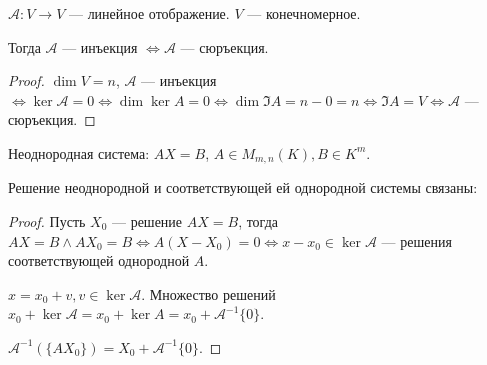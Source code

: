 \begin{theorem}
    $\mathcal{A}\!: V \to V$ --- линейное отображение.  $V$ --- конечномерное.

    Тогда  $\mathcal{A}$ --- инъекция  $\iff \mathcal{A}$ --- сюръекция.
\end{theorem}
\begin{proof}
    $\dim V = n$,  $\mathcal{A}$ --- инъекция  $\iff \ker \mathcal{A} = 0 \iff \dim \ker A = 0 \iff \dim \Im A = n - 0 = n \iff \Im A = V \iff \mathcal{A}$ --- сюръекция.
\end{proof}

\begin{definition}
    Неоднородная система: $AX=B$,  $A \in M_{m, n}(K), B \in K^m$.
\end{definition}
\begin{theorem}
    Решение неоднородной и соответствующей ей однородной системы связаны:

\end{theorem}
\begin{proof}
    Пусть $X_0$ --- решение $AX=B$, тогда  $AX=B \land AX_0=B \iff A(X-X_0) = 0 \iff x - x_0 \in \ker \mathcal{A}$ --- решения соответствующей однородной $A$.
    
    $x = x_0 + v, v \in \ker \mathcal{A} $. Множество решений $x_0 + \ker \mathcal{A} = x_0 + \ker A = x_0 + \mathcal{A}^{-1}\{0\}$. 

    $\mathcal{A}^{-1}(\{A X_0\}) = X_0 + \mathcal{A}^{-1}\{0\}$.
\end{proof}

